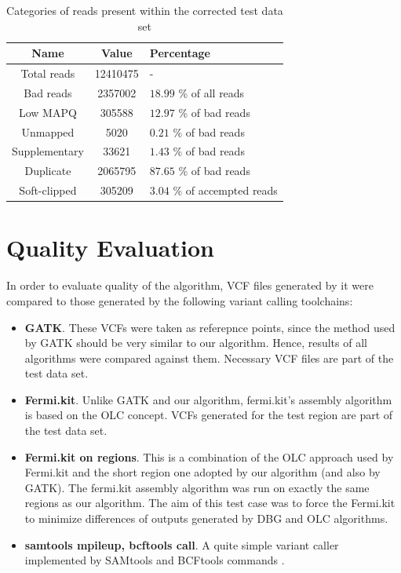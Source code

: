 \begin{table}[h]
\begin{center}
\caption{Categories of reads present within the corrected test data set}
\label{tab:corrected-set-categories}
\begin{tabular}{| c | c | p{5cm} |}
\hline
Name & Value & Percentage \\
\hline
Total reads & 12410475 & - \\
\hline
Bad reads & 2357002  & $18.99$ \% of all reads \\
\hline
Low MAPQ & 305588 & $12.97$ \% of bad reads \\
\hline
Unmapped & 5020 & $0.21$ \% of bad reads \\
\hline
Supplementary & 33621 & $1.43$ \% of bad reads \\
\hline
Duplicate & 2065795 & $87.65$ \% of bad reads \\
\hline
Soft-clipped & 305209 & $3.04$ \% of accempted reads \\
\hline
\end{tabular}
\end{center}
\end{table}

\section{Quality Evaluation}
\label{sec:quality-evaulation}

In order to evaluate quality of the algorithm, VCF files generated by it were compared to those generated by the following variant calling toolchains:
\begin{itemize}
\item \textbf{GATK}. These VCFs were taken as referepnce points, since the method used by GATK should be very similar to our algorithm. Hence, results of all algorithms were compared against them. Necessary VCF files are part of the test data set.
\item \textbf{Fermi.kit}. Unlike GATK and our algorithm, fermi.kit's assembly algorithm is based on the OLC concept. VCFs generated for the test region are part of the test data set.
\item \textbf{Fermi.kit on regions}. This is a combination of the OLC approach used by Fermi.kit and the short region one adopted by our algorithm (and also by GATK). The fermi.kit assembly algorithm was run on exactly the same regions as our algorithm. The aim of this test case was to force the Fermi.kit to minimize differences of outputs generated by DBG and OLC algorithms.
\item \textbf{samtools mpileup, bcftools call}. A quite simple variant caller implemented by SAMtools and BCFtools commands \cite{samtools}.
\end{itemize}

